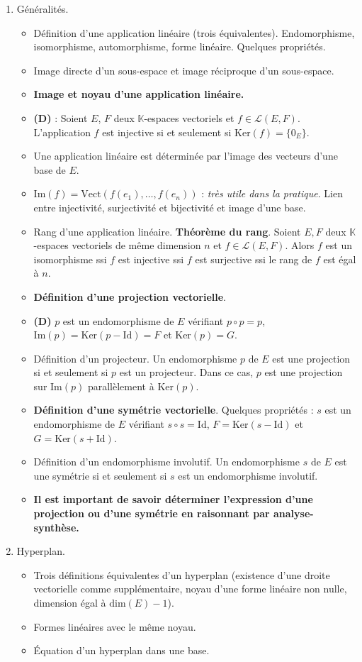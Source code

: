 \documentclass[twoside,a4paper,french,10pt]{VcCours}
\begin{document}
\begin{enumerate}
\item Généralités.
\begin{itemize}
\item Définition d'une application linéaire (trois équivalentes). Endomorphisme, isomorphisme, automorphisme, forme linéaire. Quelques propriétés.
\item Image directe d'un sous-espace et image réciproque d'un sous-espace.
\item \textbf{Image et noyau d'une application linéaire.} 
\item \textbf{(D)} : Soient $E$, $F$ deux $\mathbb{K}$-espaces vectoriels et $f \in \mathcal{L}(E,F)$. L'application $f$ est injective si et seulement si $\textrm{Ker}(f) = \lbrace 0_E \rbrace$.
\item Une application linéaire est déterminée par l'image des vecteurs d'une base de $E$. 
\item $\textrm{Im}(f) = \textrm{Vect}(f(e_1), \ldots, f(e_n))$ : \textit{très utile dans la pratique}. Lien entre injectivité, surjectivité et bijectivité et image d'une base.
\item Rang d'une application linéaire. \textbf{Théorème du rang}. Soient $E, F$ deux $\mathbb{K}$-espaces vectoriels de même dimension $n$ et $f \in \mathcal{L}(E,F)$. Alors $f$ est un isomorphisme ssi $f$ est injective ssi $f$ est surjective ssi le rang de $f$ est égal à $n$.
\item \textbf{Définition d'une projection vectorielle}. 
\item \textbf{(D)} $p$ est un endomorphisme de $E$ vérifiant $p \circ p = p$, $\textrm{Im}(p) = \textrm{Ker}(p-\textrm{Id})=F$ et $\textrm{Ker}(p)=G$.
\item Définition d'un projecteur. Un endomorphisme $p$ de $E$ est une projection si et seulement si $p$ est un projecteur. Dans ce cas, $p$ est une projection sur $\textrm{Im}(p)$ parallèlement à $\textrm{Ker}(p)$.
\item \textbf{Définition d'une symétrie vectorielle}. Quelques propriétés : $s$ est un endomorphisme de $E$ vérifiant $s \circ s = \textrm{Id}$, $F = \textrm{Ker}(s-\textrm{Id})$ et $G= \textrm{Ker}(s+\textrm{Id})$.
\item Définition d'un endomorphisme involutif. Un endomorphisme $s$ de $E$ est une symétrie si et seulement si $s$ est un endomorphisme involutif.
\item \textbf{Il est important de savoir déterminer l'expression d'une projection ou d'une symétrie en raisonnant par analyse-synthèse.}
\end{itemize}
\item Hyperplan.
\begin{itemize}
\item Trois définitions équivalentes d'un hyperplan (existence d'une droite vectorielle comme supplémentaire, noyau d'une forme linéaire non nulle, dimension égal à $\textrm{dim}(E)-1$).
\item Formes linéaires avec le même noyau.
\item Équation d'un hyperplan dans une base.
\end{itemize}
\end{enumerate}
\end{document}
